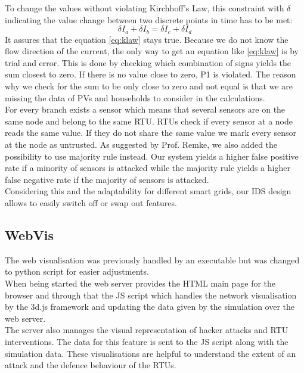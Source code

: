 \documentclass[conference]{IEEEtran}
\begin{document}
		To change the values without violating Kirchhoff's Law, this constraint with $\delta$ indicating the value change between two discrete points in time has to be met:
		\begin{equation}
			\delta I_a + \delta I_b = \delta I_c + \delta I_d
		\end{equation}
		It assures that the equation \ref{eq:klaw} stays true. Because we do not know the flow direction of the current, the only way to get an equation like \ref{eq:klaw} is by trial and error. This is done by checking which combination of signs yields the sum closest to zero. If there is no value close to zero, P1 is violated. The reason why we check for the sum to be only close to zero and not equal is that we are missing the data of PVs and households to consider in the calculations. \\
		For every branch exists a sensor which means that several sensors are on the same node and belong to the same RTU. RTUs check if every sensor at a node reads the same value. If they do not share the same value we mark every sensor at the node as untrusted. As suggested by Prof. Remke, we also added the possibility to use majority rule instead. Our system yields a higher false positive rate if a minority of sensors is attacked while the majority rule yields a higher false negative rate if the majority of sensors is attacked. \\
		Considering this and the adaptability for different smart grids, our IDS design allows to easily switch off or swap out features.		
	
	\subsection{WebVis}
		
		The web visualisation was previously handled by an executable but was changed to python script for easier adjustments. \\
		When being started the web server provides the HTML main page for the browser and through that the JS script which handles the network visualisation by the 3d.js framework and updating the data given by the simulation over the web server. \\
		The server also manages the visual representation of hacker attacks and RTU interventions. The data for this feature is sent to the JS script along with the simulation data. These visualisations are helpful to understand the extent of an attack and the defence behaviour of the RTUs.
\end{document}
